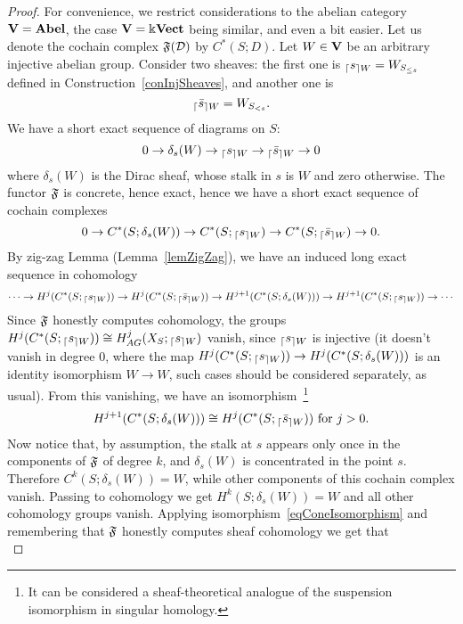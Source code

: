 \begin{proof}
For convenience, we restrict considerations to the abelian category $\mathbf{V}=\mathbf{Abel}$, the case $\mathbf{V}=\Bbbk\mathbf{Vect}$ being similar, and even a bit easier. Let us denote the cochain complex $\mathfrak{F}(\mathcal{D})$ by $C^*(S;D)$. Let $W\in\mathbf{V}$ be an arbitrary injective abelian group. Consider two sheaves: the first one is ${_{\lceil}s_{\rceil W}}=W_{S_{\leq s}}$ defined in Construction~\ref{conInjSheaves}, and another one is
\begin{equation}\label{eqCutLow}
{_{\lceil}\bar{s}_{\rceil W}}=W_{S_{<s}}.
\end{equation}
We have a short exact sequence of diagrams on $S$:
\[
0\to \delta_s(W)\to {_{\lceil}s_{\rceil W}}\to {_{\lceil}\bar{s}_{\rceil W}}\to 0
\]
where $\delta_s(W)$ is the Dirac sheaf, whose stalk in $s$ is $W$ and zero otherwise. The functor $\mathfrak{F}$ is concrete, hence exact, hence we have a short exact sequence of cochain complexes
\begin{equation}\label{eqShortExactCochainDelta}
0\to C^*(S;\delta_s(W))\to C^*(S;{_{\lceil}s_{\rceil W}})\to C^*(S;{_{\lceil}\bar{s}_{\rceil W}})\to 0.
\end{equation}
By zig-zag Lemma (Lemma~\ref{lemZigZag}), we have an induced long exact sequence in cohomology
\[
\cdots\to H^j(C^*(S;{_{\lceil}s_{\rceil W}}))\to H^j(C^*(S;{_{\lceil}\bar{s}_{\rceil W}}))\to  H^{j+1}(C^*(S;\delta_s(W)))\to H^{j+1}(C^*(S;{_{\lceil}s_{\rceil W}}))\to\cdots
\]
Since $\mathfrak{F}$ honestly computes cohomology, the groups $H^j(C^*(S;{_{\lceil}s_{\rceil W}}))\cong H_{AG}^j(X_S;{_{\lceil}s_{\rceil W}})$ vanish, since ${_{\lceil}s_{\rceil W}}$ is injective (it doesn't vanish in degree 0, where the map $H^j(C^*(S;{_{\lceil}s_{\rceil W}}))\to H^j(C^*(S;\delta_s(W)))$ is an identity isomorphism $W\to W$, such cases should be considered separately, as usual). From this vanishing, we have an isomorphism~\footnote{It can be considered a sheaf-theoretical analogue of the suspension isomorphism in singular homology.}
\begin{equation}\label{eqConeIsomorphism}
H^{j+1}(C^*(S;\delta_s(W)))\cong H^j(C^*(S;{_{\lceil}\bar{s}_{\rceil W}}))\mbox{ for }j>0.
\end{equation}
Now notice that, by assumption, the stalk at $s$ appears only once in the components of $\mathfrak{F}$ of degree $k$, and $\delta_s(W)$ is concentrated in the point $s$. Therefore $C^k(S;\delta_s(W))=W$, while other components of this cochain complex vanish. Passing to cohomology we get $H^k(S;\delta_s(W))=W$ and all other cohomology groups vanish. Applying isomorphism~\eqref{eqConeIsomorphism} and remembering that $\mathfrak{F}$ honestly computes sheaf cohomology we get that
\begin{equation}\label{eqSphereLikeVanishing}

\end{equation}
\end{proof}
